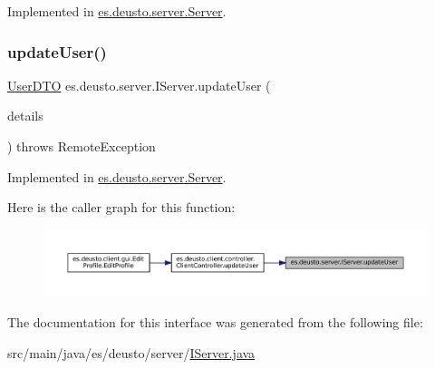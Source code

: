 Implemented in \mbox{\hyperlink{classes_1_1deusto_1_1server_1_1_server_a16789cc76edd46978ffbb58581caf5db}{es.\+deusto.\+server.\+Server}}.

\mbox{\label{interfacees_1_1deusto_1_1server_1_1_i_server_aff376200af975b145ac85ccfdf48a229}} 
\subsubsection{\texorpdfstring{updateUser()}{updateUser()}}
{\footnotesize\ttfamily \mbox{\hyperlink{classes_1_1deusto_1_1server_1_1data_1_1_user_d_t_o}{User\+D\+TO}} es.\+deusto.\+server.\+I\+Server.\+update\+User (\begin{DoxyParamCaption}\item[{\mbox{\hyperlink{classes_1_1deusto_1_1server_1_1data_1_1_user_details_d_t_o}{User\+Details\+D\+TO}}}]{details }\end{DoxyParamCaption}) throws Remote\+Exception}



Implemented in \mbox{\hyperlink{classes_1_1deusto_1_1server_1_1_server_a74082f91af2065cd600c147296090921}{es.\+deusto.\+server.\+Server}}.

Here is the caller graph for this function\+:
\nopagebreak
\begin{figure}[H]
\begin{center}
\leavevmode
\includegraphics[width=350pt]{interfacees_1_1deusto_1_1server_1_1_i_server_aff376200af975b145ac85ccfdf48a229_icgraph}
\end{center}
\end{figure}


The documentation for this interface was generated from the following file\+:\begin{DoxyCompactItemize}
\item 
src/main/java/es/deusto/server/\mbox{\hyperlink{_i_server_8java}{I\+Server.\+java}}\end{DoxyCompactItemize}
